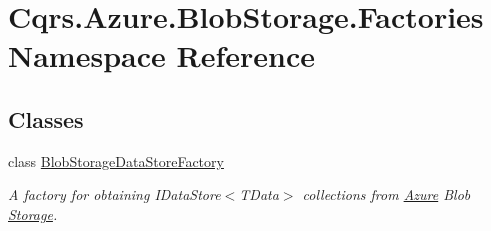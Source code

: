 \hypertarget{namespaceCqrs_1_1Azure_1_1BlobStorage_1_1Factories}{}\section{Cqrs.\+Azure.\+Blob\+Storage.\+Factories Namespace Reference}
\label{namespaceCqrs_1_1Azure_1_1BlobStorage_1_1Factories}
\subsection*{Classes}
\begin{DoxyCompactItemize}
\item 
class \hyperlink{classCqrs_1_1Azure_1_1BlobStorage_1_1Factories_1_1BlobStorageDataStoreFactory}{Blob\+Storage\+Data\+Store\+Factory}
\begin{DoxyCompactList}\small\item\em A factory for obtaining I\+Data\+Store$<$\+T\+Data$>$ collections from \hyperlink{namespaceCqrs_1_1Azure}{Azure} Blob \hyperlink{namespaceCqrs_1_1Azure_1_1Storage}{Storage}. \end{DoxyCompactList}\end{DoxyCompactItemize}
